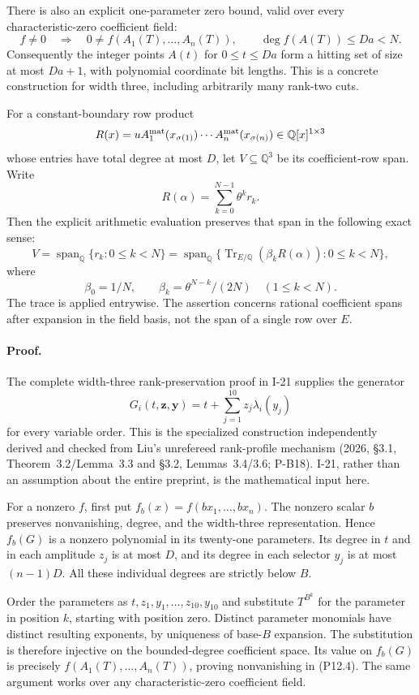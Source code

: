\documentclass[11pt,a4paper]{article}
\theoremstyle{definition}\newtheorem{definition}{Definition}
\begin{document}
There is also an explicit one-parameter zero bound, valid over every characteristic-zero coefficient field:
\[
 f\ne0\quad\Longrightarrow\quad
 0\ne f(A_1(T),\ldots,A_n(T)),\qquad
 \deg f(A(T))\le Da<N.
 \tag{P12.4}
\]
Consequently the integer points $A(t)$ for $0\le t\le Da$ form a hitting set of size at most $Da+1$, with polynomial coordinate bit lengths.  This is a concrete construction for width three, including arbitrarily many rank-two cuts.

For a constant-boundary row product
\[
 R(x)=uA^{\rm mat}_1(x_{\sigma(1)})\cdots
          A^{\rm mat}_n(x_{\sigma(n)})\in\mathbb Q[x]^{1\times3}
\]
whose entries have total degree at most $D$, let $V\subseteq\mathbb Q^3$ be its coefficient-row span.  Write
\[
 R(\alpha)=\sum_{k=0}^{N-1}\theta^k r_k.
\]
Then the explicit arithmetic evaluation preserves that span in the following exact sense:
\[
 V=\operatorname{span}_{\mathbb Q}\{r_k:0\le k<N\}
  =\operatorname{span}_{\mathbb Q}
       \{\operatorname{Tr}_{E/\mathbb Q}(\beta_k R(\alpha)):0\le k<N\},
 \tag{P12.5}
\]
where
\[
 \beta_0=1/N,\qquad \beta_k=\theta^{N-k}/(2N)\quad(1\le k<N).
\]
The trace is applied entrywise.  The assertion concerns rational coefficient spans after expansion in the field basis, not the span of a single row over $E$.

\paragraph{Proof.}
The complete width-three rank-preservation proof in I-21 supplies the generator
\[
 G_i(t,\mathbf z,\mathbf y)=t+\sum_{j=1}^{10}z_j\lambda_i(y_j)
\]
for every variable order.  This is the specialized construction independently derived and checked from Liu's unrefereed rank-profile mechanism (2026, \S3.1, Theorem~3.2/Lemma~3.3 and \S3.2, Lemmas~3.4/3.6; P-B18).  I-21, rather than an assumption about the entire preprint, is the mathematical input here.

For a nonzero $f$, first put $f_b(x)=f(bx_1,\ldots,bx_n)$.  The nonzero scalar $b$ preserves nonvanishing, degree, and the width-three representation.  Hence $f_b(G)$ is a nonzero polynomial in its twenty-one parameters.  Its degree in $t$ and in each amplitude $z_j$ is at most $D$, and its degree in each selector $y_j$ is at most $(n-1)D$.  All these individual degrees are strictly below $B$.

Order the parameters as $t,z_1,y_1,\ldots,z_{10},y_{10}$ and substitute $T^{B^k}$ for the parameter in position $k$, starting with position zero.  Distinct parameter monomials have distinct resulting exponents, by uniqueness of base-$B$ expansion.  The substitution is therefore injective on the bounded-degree coefficient space.  Its value on $f_b(G)$ is precisely $f(A_1(T),\ldots,A_n(T))$, proving nonvanishing in (P12.4).  The same argument works over any characteristic-zero coefficient field.
\end{document}
